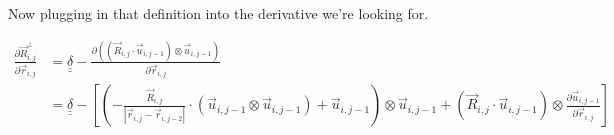 \documentclass{article}
\renewcommand{\ij}{_{i,j}}
\newcommand{\ijj}{_{i,j-1}}
\newcommand{\ijjj}{_{i,j-2}}
\newcommand{\magn}[1]{\left\vert #1 \right\vert }
\renewcommand{\part}[2]{\frac{\partial #1 }{\partial #2}}
\newcommand{\ten}[1]{\underline{\underline{#1}}}
\newcommand{\rij}{\vec{r} \ij}
\newcommand{\Rij}{\vec{R} \ij}
\newcommand{\rijj}{\vec{r} \ijj}
\newcommand{\rijjj}{\vec{r} \ijjj}
\newcommand{\uijj}{\vec{u} \ijj}
\begin{document}

Now plugging in that definition into the derivative we're looking for.

\begin{align*}
  \part{\vec{R}\ij ^ \bot}{\vec{r}\ij}  &=  \ten{\delta} 
  - \part{\left(\left(\vec{R}\ij \cdot \vec{u} \ijj \right) \otimes 
  \vec{u} \ijj \right)
  }{\vec{r}\ij} \\
  &= 
  \ten{\delta} 
  -
  \left[
  \left(
  -\frac{\vec{R} \ij}{\magn{\rij - \rijjj}} \cdot (\uijj \otimes \uijj ) 
  +  \uijj
  \right) \otimes \uijj
  +  
  \left(\vec{R}\ij \cdot \vec{u} \ijj \right)
  \otimes 
  {\part{\vec{u} \ijj }{\vec{r}\ij} }
  \right]
\end{align*}
 
\end{document}

